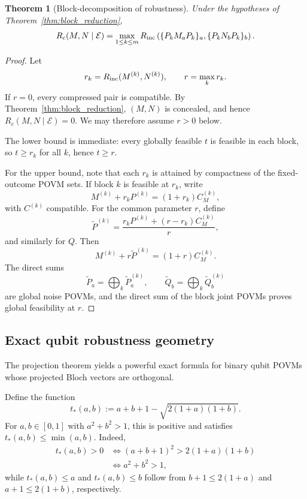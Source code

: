 \documentclass[
aps,pra,twocolumn,10pt,
superscriptaddress,longbibliography,floatfix
]{revtex4-2}
\newtheorem{theorem}{Theorem}[section]
\begin{document}
\begin{theorem}[Block-decomposition of robustness]
\label{thm:block_robustness}
Under the hypotheses of Theorem~\ref{thm:block_reduction},
\[
R_c(M,N\mid\mathcal E)
=
\max_{1\le k\le m}
R_{\rm inc}
\left(
\{P_k M_a P_k\}_a,
\{P_k N_b P_k\}_b
\right).
\]
\end{theorem}

\begin{proof}
Let
\[
r_k=R_{\rm inc}(M^{(k)},N^{(k)}),\qquad r=\max_k r_k.
\]
If $r=0$, every compressed pair is compatible. By Theorem~\ref{thm:block_reduction}, $(M,N)$ is concealed, and hence $R_c(M,N\mid\mathcal E)=0$. We may therefore assume $r>0$ below.

The lower bound is immediate: every globally feasible $t$ is feasible in each block, so $t\ge r_k$ for all $k$, hence $t\ge r$.

For the upper bound, note that each $r_k$ is attained by compactness of the fixed-outcome POVM sets. If block $k$ is feasible at $r_k$, write
\[
M^{(k)}+r_kP^{(k)}=(1+r_k)C_M^{(k)},
\]
with $C^{(k)}$ compatible. For the common parameter $r$, define
\[
\widetilde P^{(k)}
=
\frac{
r_kP^{(k)}+(r-r_k)C_M^{(k)}
}{r},
\]
and similarly for $Q$. Then
\[
M^{(k)}+r\widetilde P^{(k)}=(1+r)C_M^{(k)}.
\]
The direct sums
\[
\widetilde P_a=\bigoplus_k\widetilde P_a^{(k)},
\qquad
\widetilde Q_b=\bigoplus_k\widetilde Q_b^{(k)}
\]
are global noise POVMs, and the direct sum of the block joint POVMs proves global feasibility at $r$.
\end{proof}

\subsection{Exact qubit robustness geometry}

The projection theorem yields a powerful exact formula for binary qubit POVMs whose projected Bloch vectors are orthogonal.

Define the function
\[
t_*(a,b):=
a+b+1-\sqrt{2(1+a)(1+b)}.
\]
For $a,b\in[0,1]$ with $a^2+b^2>1$, this is positive and satisfies $t_*(a,b)\le\min(a,b)$. Indeed,
\begin{align*}
t_*(a,b)>0
&\iff (a+b+1)^2>2(1+a)(1+b)\\
&\iff a^2+b^2>1,
\end{align*}
while $t_*(a,b)\le a$ and $t_*(a,b)\le b$ follow from $b+1\le2(1+a)$ and $a+1\le2(1+b)$, respectively.
\end{document}
